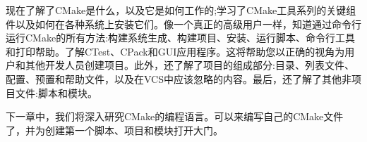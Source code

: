 现在了解了CMake是什么，以及它是如何工作的;学习了CMake工具系列的关键组件以及如何在各种系统上安装它们。像一个真正的高级用户一样，知道通过命令行运行CMake的所有方法:构建系统生成、构建项目、安装、运行脚本、命令行工具和打印帮助。了解CTest、CPack和GUI应用程序。这将帮助您以正确的视角为用户和其他开发人员创建项目。此外，还了解了项目的组成部分:目录、列表文件、配置、预置和帮助文件，以及在VCS中应该忽略的内容。最后，还了解了其他非项目文件:脚本和模块。

下一章中，我们将深入研究CMake的编程语言。可以来编写自己的CMake文件了，并为创建第一个脚本、项目和模块打开大门。
